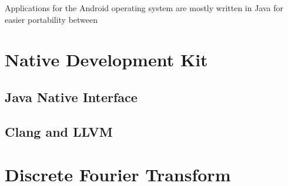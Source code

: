 
Applications for the Android operating system are mostly written in Java for easier portability between \cite[p.~33]{nolan2012decompiling}

\section{Native Development Kit}

\subsection{Java Native Interface}

\subsection{Clang and LLVM}

\section{Discrete Fourier Transform}

